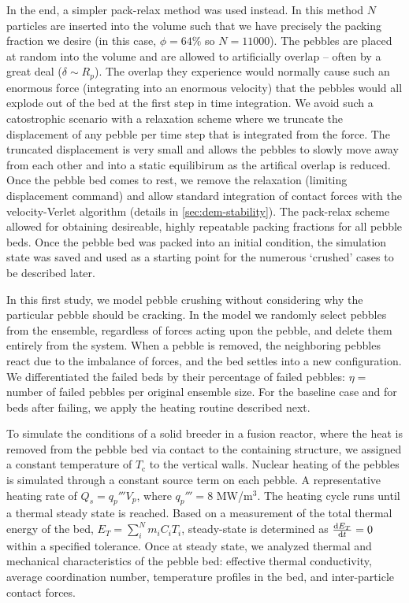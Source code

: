 In the end, a simpler pack-relax method was used instead. In this method $N$ particles are inserted into the volume such that we have precisely the packing fraction we desire (in this case, $\phi = 64\%$ so $N = 11000$). The pebbles are placed at random into the volume and are allowed to artificially overlap -- often by a great deal ($\delta \sim R_p$). The overlap they experience would normally cause such an enormous force (integrating into an enormous velocity) that the pebbles would all explode out of the bed at the first step in time integration. We avoid such a catostrophic scenario with a relaxation scheme where we truncate the displacement of any pebble per time step that is integrated from the force. The truncated displacement is very small and allows the pebbles to slowly move away from each other and into a static equilibirum as the artifical overlap is reduced. Once the pebble bed comes to rest, we remove the relaxation (limiting displacement command) and allow standard integration of contact forces with the velocity-Verlet algorithm (details in \cref{sec:dem-stability}). The pack-relax scheme allowed for obtaining desireable, highly repeatable packing fractions for all pebble beds. Once the pebble bed was packed into an initial condition, the simulation state was saved and used as a starting point for the numerous `crushed' cases to be described later.

In this first study, we model pebble crushing without considering why the particular pebble should be cracking. In the model we randomly select pebbles from the ensemble, regardless of forces acting upon the pebble, and delete them entirely from the system. When a pebble is removed, the neighboring pebbles react due to the imbalance of forces, and the bed settles into a new configuration. We differentiated the failed beds by their percentage of failed pebbles: $\eta = $ number of failed pebbles per original ensemble size. For the baseline case and for beds after failing, we apply the heating routine described next.

To simulate the conditions of a solid breeder in a fusion reactor, where the heat is removed from the pebble bed via contact to the containing structure, we assigned a constant temperature of $T_\text{c}$ to the vertical walls. Nuclear heating of the pebbles is simulated through a constant source term on each pebble. A representative heating rate of $Q_s = q_p'''V_p$, where  $q_p'''= 8$ MW/m$^3$. The heating cycle runs until a thermal steady state is reached. Based on a measurement of the total thermal energy of the bed, $E_T =\sum_i^N m_iC_i T_i$, steady-state is determined as $\frac{\mathrm{d}{E_T}}{\mathrm{d}t} = 0$ within a specified tolerance. Once at steady state, we analyzed thermal and mechanical characteristics of the pebble bed: effective thermal conductivity, average coordination number, temperature profiles in the bed, and inter-particle contact forces. 

